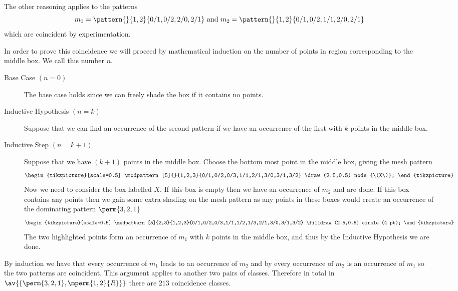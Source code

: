 The other reasoning applies to the patterns
\begin{equation*}
    m_1 = \pattern{}{1,2}{0/1,0/2,2/0,2/1} \text{ and } m_2 = \pattern{}{1,2}{0/1,0/2,1/1,2/0,2/1}
\end{equation*}
which are coincident by experimentation.

In order to prove this coincidence we will proceed by mathematical
induction on the number of points in region corresponding to the middle box.
We call this number \(n\).
\begin{description}
    \item [Base Case \((n=0)\)] The base case holds since we can freely shade the
        box if it contains no points.
    \item [Inductive Hypothesis \((n=k)\)] Suppose that we can find an occurrence
        of the second pattern if we have an occurrence of the first with \(k\) points
        in the middle box.
    \item [Inductive Step \((n=k+1)\)] Suppose that we have \((k+1)\) points in
        the middle box. Choose the bottom most point in the middle box, giving the
        mesh pattern
     \begin{equation*}
        \begin{tikzpicture}[scale=0.5]
            \modpattern[5]{}{1,2,3}{0/1,0/2,0/3,1/1,2/1,3/0,3/1,3/2}
            \draw (2.5,0.5) node {\(X\)};
        \end{tikzpicture}
    \end{equation*}
        Now we need to consider the box labelled \(X\). If this box is empty then
        we have an occurrence of \(m_2\) and are done. If this box contains
        any points then we gain some extra shading on the mesh pattern
        as any points in these boxes would create an occurrence of the dominating pattern \(\perm{3,2,1}\)
     \begin{equation*}
        \begin{tikzpicture}[scale=0.5]
            \modpattern[5]{2,3}{1,2,3}{0/1,0/2,0/3,1/1,1/2,1/3,2/1,3/0,3/1,3/2}
            \filldraw (2.5,0.5) circle (4 pt);
        \end{tikzpicture}
    \end{equation*}
        The two highlighted points form an occurrence of \(m_1\) with \(k\)
        points in the middle box, and thus by the Inductive Hypothesis we
        are done.
\end{description}
By induction we have that every occurrence of \(m_1\) leads to an occurrence of \(m_2\)
and by  every occurrence of \(m_2\) is an occurrence of
\(m_1\) so the two patterns are coincident.
This argument applies to another two pairs of classes. Therefore in
total in \(\av{\{\perm{3,2,1}, \mperm{1,2}{R}\}}\) there are \(213\) coincidence
classes.
